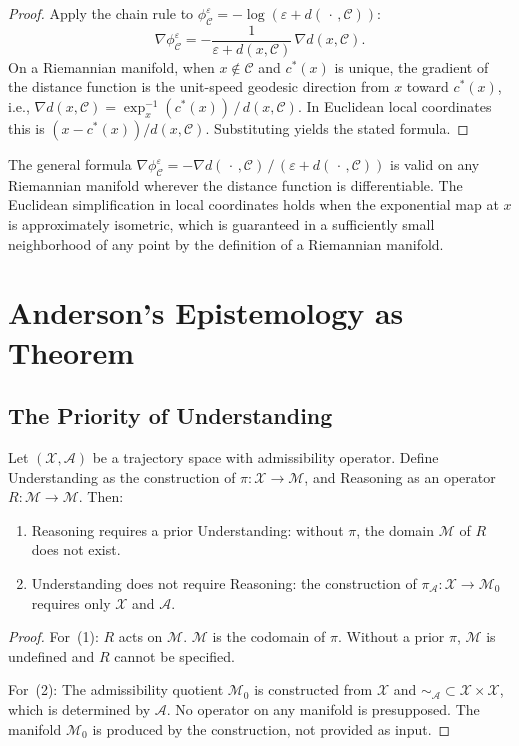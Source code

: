 \documentclass[12pt, a4paper, oneside]{book}
\newcommand{\Adm}{\mathcal{A}}
\newcommand{\X}{\mathcal{X}}
\newcommand{\M}{\mathcal{M}}
\newcommand{\C}{\mathcal{C}}
\newcommand{\proj}{\pi}
\newcommand{\projA}{\pi_{\!\Adm}}
\newcommand{\SA}{{\sim_{\!\Adm}}}
\newcommand{\phiCe}{\phi_{\C}^{\varepsilon}}
\begin{document}
\begin{proof}
Apply the chain rule to $\phiCe = -\log(\varepsilon + d(\,\cdot\,,\C))$:
\[
  \nabla \phiCe = -\frac{1}{\varepsilon + d(x,\C)}\,\nabla d(x,\C).
\]
On a Riemannian manifold, when $x \notin \C$ and $c^*(x)$ is unique,
the gradient of the distance function is the unit-speed geodesic
direction from $x$ toward $c^*(x)$, i.e.,
$\nabla d(x,\C) = \exp_x^{-1}(c^*(x))\,/\,d(x,\C)$.
In Euclidean local coordinates this is $(x - c^*(x))/d(x,\C)$.
Substituting yields the stated formula.
\end{proof}

\begin{remark}
The general formula $\nabla \phiCe = -\nabla d(\,\cdot\,,\C)\,/\,(\varepsilon + d(\,\cdot\,,\C))$
is valid on any Riemannian manifold wherever the distance function is
differentiable. The Euclidean simplification in local coordinates holds
when the exponential map at $x$ is approximately isometric, which is
guaranteed in a sufficiently small neighborhood of any point by the
definition of a Riemannian manifold.
\end{remark}

\part{Anderson's Epistemology as Theorem}

\chapter{The Priority of Understanding}
\label{ch:priority}

\begin{theorem}
\label{thm:priority}
Let $(\X, \Adm)$ be a trajectory space with admissibility operator.
Define Understanding as the construction of $\proj : \X \to \M$, and
Reasoning as an operator $R : \M \to \M$. Then:
\begin{enumerate}
  \item Reasoning requires a prior Understanding: without $\proj$, the
    domain $\M$ of $R$ does not exist.
  \item Understanding does not require Reasoning: the construction of
    $\projA : \X \to \M_0$ requires only $\X$ and $\Adm$.
\end{enumerate}
\end{theorem}

\begin{proof}
For~(1): $R$ acts on $\M$. $\M$ is the codomain of $\proj$. Without a
prior $\proj$, $\M$ is undefined and $R$ cannot be specified.

For~(2): The admissibility quotient $\M_0$ is constructed from $\X$ and
$\SA \subset \X \times \X$, which is determined by $\Adm$. No operator
on any manifold is presupposed. The manifold $\M_0$ is produced by the
construction, not provided as input.
\end{proof}
\end{document}
